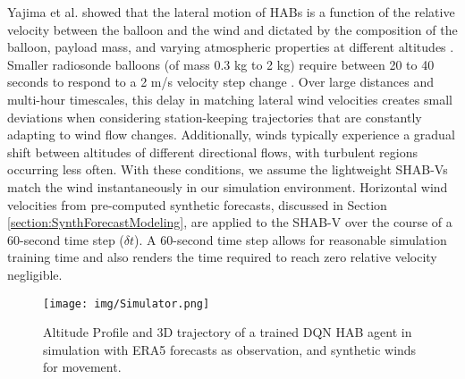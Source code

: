 Yajima et al. showed that the lateral motion of HABs is a function of the relative velocity between the balloon and the wind and dictated by the composition of the balloon, payload mass, and varying atmospheric properties at different altitudes \cite{yajima2009ballooning}. Smaller radiosonde balloons (of mass 0.3 kg to 2 kg) require between 20 to 40 seconds to respond to a 2 m/s velocity step change \cite{yajima2009ballooning}. Over large distances and multi-hour timescales, this delay in matching lateral wind velocities creates small deviations when considering station-keeping trajectories that are constantly adapting to wind flow changes. Additionally, winds typically experience a gradual shift between altitudes of different directional flows, with turbulent regions occurring less often. With these conditions, we assume the lightweight SHAB-Vs match the wind instantaneously in our simulation environment. Horizontal wind velocities from pre-computed synthetic forecasts, discussed in Section \ref{section:SynthForecastModeling}, are applied to the SHAB-V over the course of a 60-second time step ($\delta t$). A 60-second time step allows for reasonable simulation training time and also renders the time required to reach zero relative velocity negligible.




\begin{figure*}[t]
    \centering 
    \texttt{[image: img/Simulator.png]} 
    \caption{Altitude Profile and 3D trajectory of a trained DQN HAB agent in simulation with ERA5 forecasts as observation, and synthetic winds for movement.}
    \label{fig:simulator} 
\end{figure*} 

